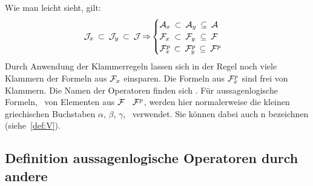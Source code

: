 Wie man leicht sieht, gilt:
\begin{equation}
	\mathcal{J}_x \: \subset \: \mathcal{J}_y \: \subset \: \mathcal{J} \operatorname{\Rightarrow}
	\begin{cases}
		\mathcal{A}_x \: \subset \: \mathcal{A}_y \: \subseteq \: \mathcal{A} \\
		\mathcal{F}_x \; \subset \: \mathcal{F}_y \; \subseteq \: \mathcal{F} \\
		\mathcal{F}_x^p\, \subset \: \mathcal{F}_y^p\, \subseteq \: \mathcal{F}^p
	\end{cases}
\end{equation}
%
Durch Anwendung der Klammerregeln  lassen sich in der Regel noch viele Klammern der Formeln aus $\mathcal{F}_x$ einsparen.
Die Formeln aus $\mathcal{F}_x^p$ sind frei von Klammern.
Die Namen der Operatoren finden sich .
Für aussagenlogische Formeln, \textdh\ von Elementen aus $\mathcal{F}$ \textbzgl\ $\mathcal{F}^p$, werden hier normalerweise die kleinen griechischen Buchstaben $\alpha$, $\beta$, $\gamma$, \textusw\ verwendet.
Sie können dabei auch n bezeichnen (siehe~\eqref{def:V}).

\subsection{Definition aussagenlogische Operatoren durch andere}%
\label{sub:ausOperatorDef}


